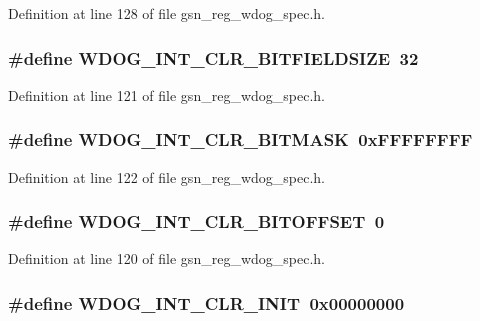 Definition at line 128 of file gsn\_\-reg\_\-wdog\_\-spec.h.

\hypertarget{a00577_a489d6069fd7795cf5695daa847b082b3}{
\subsubsection[{WDOG\_\-INT\_\-CLR\_\-BITFIELDSIZE}]{\setlength{\rightskip}{0pt plus 5cm}\#define WDOG\_\-INT\_\-CLR\_\-BITFIELDSIZE~32}}
\label{a00577_a489d6069fd7795cf5695daa847b082b3}


Definition at line 121 of file gsn\_\-reg\_\-wdog\_\-spec.h.

\hypertarget{a00577_ab9bb8cd42e35bb16f4233ccb0bf63f4b}{
\subsubsection[{WDOG\_\-INT\_\-CLR\_\-BITMASK}]{\setlength{\rightskip}{0pt plus 5cm}\#define WDOG\_\-INT\_\-CLR\_\-BITMASK~0xFFFFFFFF}}
\label{a00577_ab9bb8cd42e35bb16f4233ccb0bf63f4b}


Definition at line 122 of file gsn\_\-reg\_\-wdog\_\-spec.h.

\hypertarget{a00577_a4b2ff35df7dfcb09af909944e03dfaa3}{
\subsubsection[{WDOG\_\-INT\_\-CLR\_\-BITOFFSET}]{\setlength{\rightskip}{0pt plus 5cm}\#define WDOG\_\-INT\_\-CLR\_\-BITOFFSET~0}}
\label{a00577_a4b2ff35df7dfcb09af909944e03dfaa3}


Definition at line 120 of file gsn\_\-reg\_\-wdog\_\-spec.h.

\hypertarget{a00577_aa2a1b9bdf504b37b3f1d1a49da99d2b3}{
\subsubsection[{WDOG\_\-INT\_\-CLR\_\-INIT}]{\setlength{\rightskip}{0pt plus 5cm}\#define WDOG\_\-INT\_\-CLR\_\-INIT~0x00000000}}
\label{a00577_aa2a1b9bdf504b37b3f1d1a49da99d2b3}



